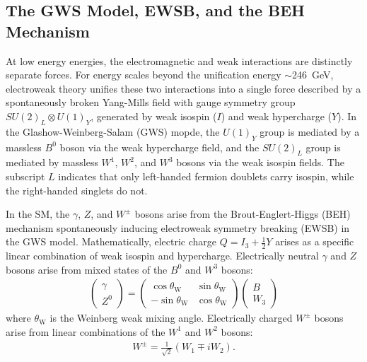 \subsection{The GWS Model, EWSB, and the BEH Mechanism}
At low energy energies, the electromagnetic and weak interactions are distinctly separate forces.
For energy scales beyond the unification energy $\sim$\SI{246}{\GeV}, electroweak theory unifies these two interactions into a single force described by a spontaneously broken Yang-Mills field with gauge symmetry group $SU(2)_L \otimes U(1)_Y$, generated by weak isospin ($I$) and weak hypercharge ($Y$).
In the Glashow-Weinberg-Salam (GWS) mopde, the $U(1)_Y$ group is mediated by a massless $B^0$ boson via the weak hypercharge field, and the $SU(2)_L$ group is mediated by massless $W^1$, $W^2$, and $W^3$ bosons via the weak isospin fields.
The subscript $L$ indicates that only left-handed fermion doublets carry isospin, while the right-handed singlets do not.

In the SM, the $\gamma$, $Z$, and $W^\pm$ bosons arise from the Brout-Englert-Higgs (BEH) mechanism spontaneously inducing electroweak symmetry breaking (EWSB) in the GWS model.
Mathematically, electric charge $Q = I_3 + \frac{1}{2} Y$ arises as a specific linear combination of weak isospin and hypercharge.
Electrically neutral $\gamma$ and $Z$ bosons arise from mixed states of the $B^0$ and $W^3$ bosons:
\begin{align}
\left(\begin{array}{c}
\gamma \\
Z^0
\end{array}\right)=\left(\begin{array}{cc}
\cos \theta_{\mathrm{W}} & \sin \theta_{\mathrm{W}} \\
-\sin \theta_{\mathrm{W}} & \cos \theta_{\mathrm{W}}
\end{array}\right)\left(\begin{array}{c}
B \\
W_3
\end{array}\right)
\label{}
\end{align}
where $\theta_{\mathrm{W}}$ is the Weinberg weak mixing angle.
Electrically charged $W^\pm$ bosons arise from linear combinations of the $W^1$ and $W^2$ bosons:
\begin{align}
W^{\pm}=\frac{1}{\sqrt{2}}\left(W_1 \mp i W_2\right).
\label{}
\end{align}

